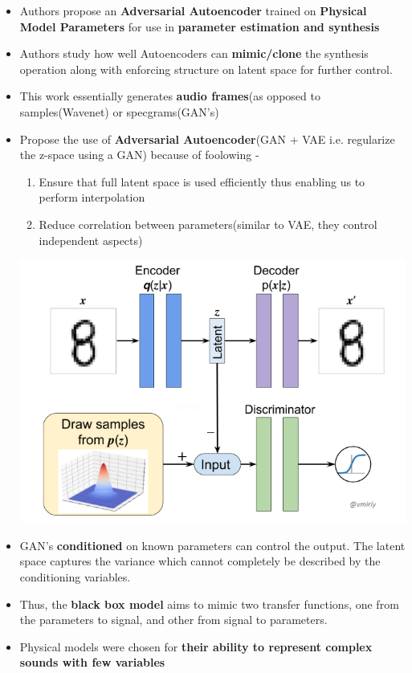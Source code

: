 \documentclass[11pt]{article}
\makeatletter
\def\maxwidth{\ifdim\Gin@nat@width>\linewidth\linewidth
    \else\Gin@nat@width\fi}
\let\Oldincludegraphics\includegraphics
\renewcommand{\includegraphics}[1]{\Oldincludegraphics[width=.8\maxwidth]{#1}}
\providecommand{\tightlist}{%
      \setlength{\itemsep}{0pt}\setlength{\parskip}{0pt}}
\makeatother
\begin{document}
    \begin{itemize}
\tightlist
\item
  Authors propose an \textbf{Adversarial Autoencoder} trained on
  \textbf{Physical Model Parameters} for use in \textbf{parameter
  estimation and synthesis}
\item
  Authors study how well Autoencoders can \textbf{mimic/clone} the
  synthesis operation along with enforcing structure on latent space for
  further control.
\item
  This work essentially generates \textbf{audio frames}(as opposed to
  samples(Wavenet) or specgrams(GAN's)
\item
  Propose the use of \textbf{Adversarial Autoencoder}(GAN + VAE i.e.
  regularize the z-space using a GAN) because of foolowing -

  \begin{enumerate}
  \def\labelenumi{\arabic{enumi}.}
  \tightlist
  \item
    Ensure that full latent space is used efficiently thus enabling us
    to perform interpolation
  \item
    Reduce correlation between parameters(similar to VAE, they control
    independent aspects)
  \end{enumerate}

  \includegraphics{fig_08.PNG}
\item
  GAN's \textbf{conditioned} on known parameters can control the output.
  The latent space captures the variance which cannot completely be
  described by the conditioning variables.
\item
  Thus, the \textbf{black box model} aims to mimic two transfer
  functions, one from the parameters to signal, and other from signal to
  parameters.
\item
  Physical models were chosen for \textbf{their ability to represent
  complex sounds with few variables}
\end{itemize}
\end{document}
